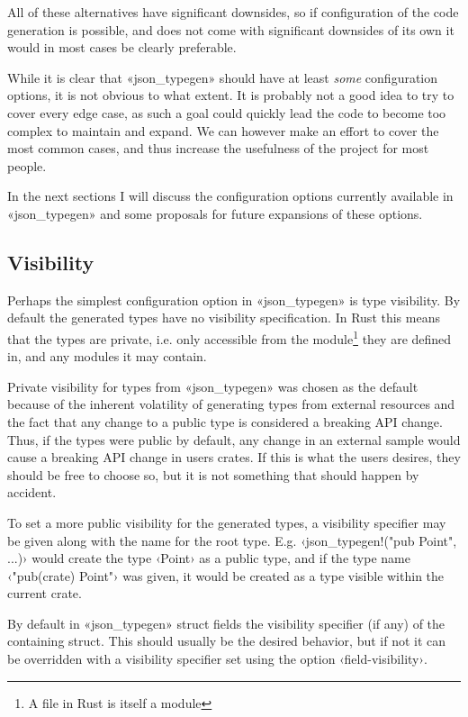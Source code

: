 All of these alternatives have significant downsides, so if configuration of the code generation is possible, and does not come with significant downsides of its own it would in most cases be clearly preferable.

While it is clear that «json_typegen» should have at least \emph{some} configuration options, it is not obvious to what extent. It is probably not a good idea to try to cover every edge case, as such a goal could quickly lead the code to become too complex to maintain and expand. We can however make an effort to cover the most common cases, and thus increase the usefulness of the project for most people.

In the next sections I will discuss the configuration options currently available in «json_typegen» and some proposals for future expansions of these options.

\subsection{Visibility}

Perhaps the simplest configuration option in «json_typegen» is type visibility. By default the generated types have no visibility specification. In Rust this means that the types are private, i.e. only accessible from the module\footnote{A file in Rust is itself a module} they are defined in, and any modules it may contain.

Private visibility for types from «json_typegen» was chosen as the default because of the inherent volatility of generating types from external resources and the fact that any change to a public type is considered a breaking API change. Thus, if the types were public by default, any change in an external sample would cause a breaking API change in users crates. If this is what the users desires, they should be free to choose so, but it is not something that should happen by accident.

To set a more public visibility for the generated types, a visibility specifier may be given along with the name for the root type. E.g. ‹json_typegen!("pub Point", ...)› would create the type ‹Point› as a public type, and if the type name ‹"pub(crate) Point"› was given, it would be created as a type visible within the current crate.

By default in «json_typegen» struct fields  the visibility specifier (if any) of the containing struct. This should usually be the desired behavior, but if not it can be overridden with a visibility specifier set using the option ‹field-visibility›.

